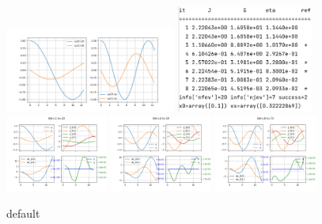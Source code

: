 \documentclass[english,12pt,a4paper]{article}
\begin{document}
\begin{figure}[htbp]
\begin{center}
\includegraphics[keepaspectratio = true, width = 0.5\textwidth] {img/osc/u0_us}\hfill
\includegraphics[keepaspectratio = true, width = 0.4\textwidth] {img/osc/info}\\\vspace{5mm}
\includegraphics[keepaspectratio = true, width = 0.3\textwidth] {img/osc/iter1}\hfill
\includegraphics[keepaspectratio = true, width = 0.3\textwidth] {img/osc/iter4}\hfill
\includegraphics[keepaspectratio = true, width = 0.3\textwidth] {img/osc/iter8}
\caption{default}
\label{default}
\end{center}
\end{figure}








\end{document}
